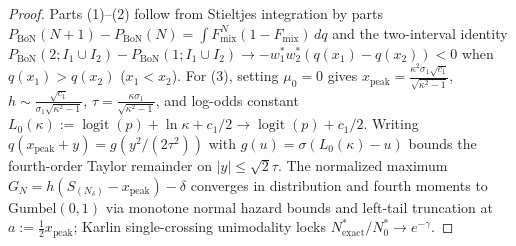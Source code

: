 \documentclass[10pt]{article}
\theoremstyle{plain}
\theoremstyle{definition}
\theoremstyle{remark}
\newcommand{\logit}{\operatorname{logit}}
\newcommand{\Fmix}{F_{\mathrm{mix}}}
\begin{document}
\begin{proof}
Parts (1)--(2) follow from Stieltjes integration by parts $P_{\mathrm{BoN}}(N+1)-P_{\mathrm{BoN}}(N) = \int \Fmix^N(1-\Fmix)\,dq$ and the two-interval identity $P_{\mathrm{BoN}}(2; I_1\cup I_2) - P_{\mathrm{BoN}}(1; I_1\cup I_2) \to -w_1^* w_2^*(q(x_1)-q(x_2)) < 0$ when $q(x_1) > q(x_2)$ ($x_1 < x_2$). For (3), setting $\mu_0 = 0$ gives $x_{\mathrm{peak}} = \frac{\kappa^2\sigma_1\sqrt{c_1}}{\sqrt{\kappa^2-1}}$, $h \sim \frac{\sqrt{c_1}}{\sigma_1\sqrt{\kappa^2-1}}$, $\tau = \frac{\kappa\sigma_1}{\sqrt{\kappa^2-1}}$, and log-odds constant $L_0(\kappa) := \logit(p) + \ln\kappa + c_1/2 \to \logit(p) + c_1/2$. Writing $q(x_{\mathrm{peak}}+y) = g(y^2/(2\tau^2))$ with $g(u) = \sigma(L_0(\kappa) - u)$ bounds the fourth-order Taylor remainder on $|y| \le \sqrt{2}\tau$. The normalized maximum $G_N = h(S_{(N_\delta)} - x_{\mathrm{peak}}) - \delta$ converges in distribution and fourth moments to $\mathrm{Gumbel}(0,1)$ via monotone normal hazard bounds and left-tail truncation at $a := \frac{1}{2}x_{\mathrm{peak}}$; Karlin single-crossing unimodality locks $N^*_{\mathrm{exact}}/N_0^* \to e^{-\gamma}$.
\end{proof}
\end{document}
